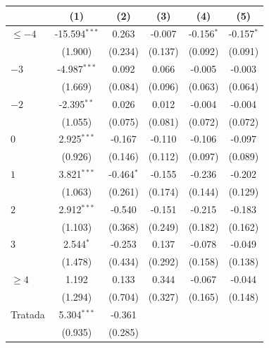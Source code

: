 
\begingroup
\centering
\begin{tabular}{lccccc}
   \toprule
                        & (1)             & (2)          & (3)     & (4)          & (5)\\  
   \midrule 
   $\leq -4$            & -15.594$^{***}$ & 0.263        & -0.007  & -0.156$^{*}$ & -0.157$^{*}$\\   
                        & (1.900)         & (0.234)      & (0.137) & (0.092)      & (0.091)\\   
   $-3$                 & -4.987$^{***}$  & 0.092        & 0.066   & -0.005       & -0.003\\   
                        & (1.669)         & (0.084)      & (0.096) & (0.063)      & (0.064)\\   
   $-2$                 & -2.395$^{**}$   & 0.026        & 0.012   & -0.004       & -0.004\\   
                        & (1.055)         & (0.075)      & (0.081) & (0.072)      & (0.072)\\   
   $0$                  & 2.925$^{***}$   & -0.167       & -0.110  & -0.106       & -0.097\\   
                        & (0.926)         & (0.146)      & (0.112) & (0.097)      & (0.089)\\   
   $1$                  & 3.821$^{***}$   & -0.464$^{*}$ & -0.155  & -0.236       & -0.202\\   
                        & (1.063)         & (0.261)      & (0.174) & (0.144)      & (0.129)\\   
   $2$                  & 2.912$^{***}$   & -0.540       & -0.151  & -0.215       & -0.183\\   
                        & (1.103)         & (0.368)      & (0.249) & (0.182)      & (0.162)\\   
   $3$                  & 2.544$^{*}$     & -0.253       & 0.137   & -0.078       & -0.049\\   
                        & (1.478)         & (0.434)      & (0.292) & (0.158)      & (0.138)\\   
   $\geq 4$             & 1.192           & 0.133        & 0.344   & -0.067       & -0.044\\   
                        & (1.294)         & (0.704)      & (0.327) & (0.165)      & (0.148)\\   
   Tratada              & 5.304$^{***}$   & -0.361       &         &              &   \\   
                        & (0.935)         & (0.285)      &         &              &   \\   

\end{tabular}
